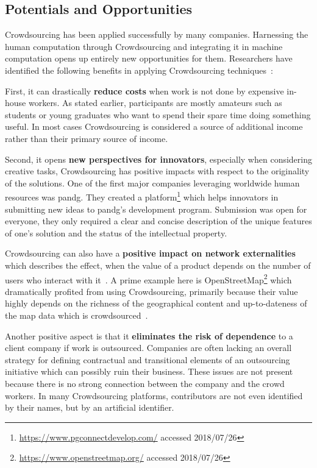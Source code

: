 \subsection{Potentials and Opportunities}
Crowdsourcing has been applied successfully by many companies. Harnessing the human computation through Crowdsourcing and integrating it in machine computation opens up entirely new opportunities for them. Researchers have identified the following benefits in applying Crowdsourcing techniques~\cite{schenk2012}:

First, it can drastically \textbf{reduce costs} when work is not done by expensive in-house workers. As stated earlier, participants are mostly amateurs such as students or young graduates who want to spend their spare time doing something useful. In most cases Crowdsourcing is considered a source of additional income rather than their primary source of income. 

Second, it opens \textbf{new perspectives for innovators}, especially when considering creative tasks, Crowdsourcing has positive impacts with respect to the originality of the solutions. One of the first major companies leveraging worldwide human resources was \gls{pandg}. They created a platform\footnote{\url{https://www.pgconnectdevelop.com/} accessed 2018/07/26} which helps innovators in submitting new ideas to \gls{pandg}'s development program. Submission was open for everyone, they only required a clear and concise description of the unique features of one's solution and the status of the intellectual property. 

Crowdsourcing can also have a \textbf{positive impact on network externalities} which describes the effect, when the value of a product depends on the number of users who interact with it~\cite{shapiro1998}. A prime example here is OpenStreetMap\footnote{\url{https://www.openstreetmap.org/} accessed 2018/07/26} which dramatically profited from using Crowdsourcing, primarily because their value highly depends on the richness of the geographical content and up-to-dateness of the map data which is crowdsourced~\cite{chilton2009}. 

Another positive aspect is that it \textbf{eliminates the risk of dependence} to a client company if work is outsourced. Companies are often lacking an overall strategy for defining contractual and transitional elements of an outsourcing initiative which can possibly ruin their business. These issues are not present because there is no strong connection between the company and the crowd workers. In many Crowdsourcing platforms, contributors are not even identified by their names, but by an artificial identifier. 

